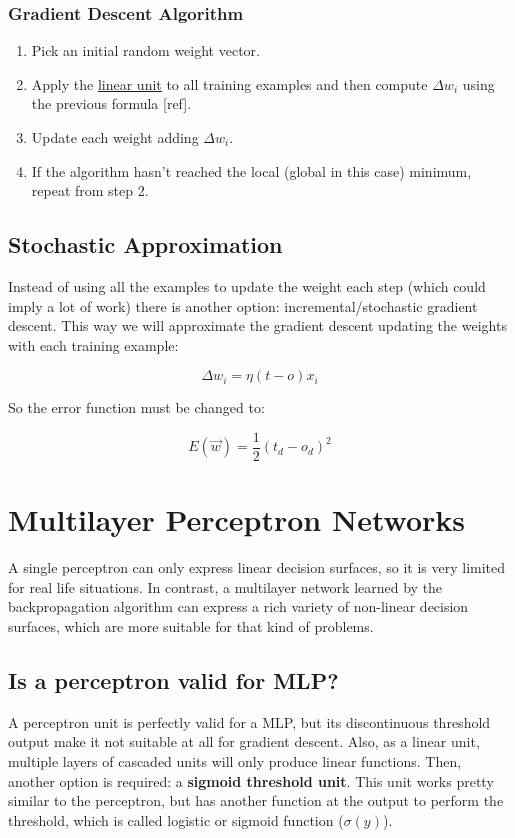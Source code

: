 \documentclass{article}
\begin{document}
	\subsubsection{Gradient Descent Algorithm}

	\begin{enumerate}

		\item Pick an initial random weight vector.
		\item Apply the \hyperref[linear_unit]{linear unit} to all training examples and then compute $\Delta w_i$  using the previous formula [ref].
		\item Update each weight adding $\Delta w_i$.
		\item If the algorithm hasn’t reached the local (global in this case) minimum, repeat from step 2.
	
	\end{enumerate}

	\subsection{Stochastic Approximation}
	Instead of using all the examples to update the weight each step (which could imply a lot of work) there is another option: incremental/stochastic gradient descent. This way we will approximate the gradient descent updating the weights with each training example:

	\begin{equation}
		\label{delta_rule}
		\Delta w_{i}= \eta (t - o) x_{i}
	\end{equation}

	So the error function must be changed to:

	\begin{equation}
		\label{error_function_stoc_square}
		E(\vec{w}) = \frac{1}{2} (t_d-o_d)^2 
	\end{equation}

\section{Multilayer Perceptron Networks}
A single perceptron can only express linear decision surfaces, so it is very limited for real life situations.  In contrast, a multilayer network learned by the backpropagation algorithm can express a rich variety of non-linear decision surfaces, which are more suitable for that kind of problems.

\subsection{Is a perceptron valid for MLP?}
A perceptron unit is perfectly valid for a MLP, but its discontinuous threshold output make it not suitable at all for gradient descent. Also, as a linear unit, multiple layers of cascaded units will only produce linear functions. Then, another option is required: a \textbf{sigmoid threshold unit}. This unit works pretty similar to the perceptron, but has another function at the output to perform the threshold, which is called logistic or sigmoid function ($\sigma(y)$).
\end{document}
